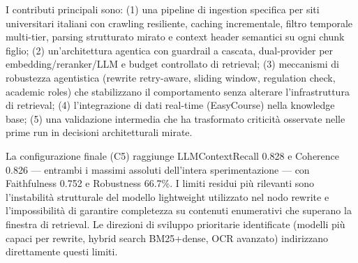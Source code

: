 \documentclass[11pt,a4paper]{article}
\begin{document}
I contributi principali sono: (1) una pipeline di ingestion specifica per siti universitari
italiani con crawling resiliente, caching incrementale, filtro temporale multi-tier, parsing
strutturato mirato e context header semantici su ogni chunk figlio; (2) un'architettura
agentica con guardrail a cascata, dual-provider per embedding/reranker/LLM e budget
controllato di retrieval; (3) meccanismi di robustezza agentistica (rewrite retry-aware,
sliding window, regulation check, academic roles) che stabilizzano il comportamento
senza alterare l'infrastruttura di retrieval; (4) l'integrazione di dati real-time
(EasyCourse) nella knowledge base; (5) una validazione intermedia che ha trasformato
criticità osservate nelle prime run in decisioni architetturali mirate.

La configurazione finale (C5) raggiunge LLMContextRecall 0.828 e Coherence 0.826
--- entrambi i massimi assoluti dell'intera sperimentazione --- con Faithfulness 0.752
e Robustness 66.7\%. I limiti residui più rilevanti sono l'instabilità strutturale del
modello lightweight utilizzato nel nodo rewrite e l'impossibilità di garantire
completezza su contenuti enumerativi che superano la finestra di retrieval. Le
direzioni di sviluppo prioritarie identificate (modelli più capaci per rewrite,
hybrid search BM25+dense, OCR avanzato) indirizzano direttamente questi limiti.
\end{document}
